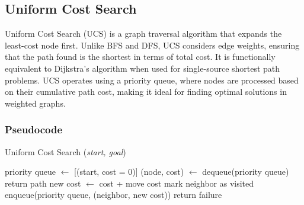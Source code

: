 \subsection{Uniform Cost Search}
\noindent Uniform Cost Search (UCS) is a graph traversal algorithm that expands the least-cost node first. Unlike BFS and DFS, UCS considers edge weights, ensuring that the path found is the shortest in terms of total cost. It is functionally equivalent to Dijkstra’s algorithm when used for single-source shortest path problems. UCS operates using a priority queue, where nodes are processed based on their cumulative path cost, making it ideal for finding optimal solutions in weighted graphs.

\subsubsection{Pseudocode}
\begin{algorithm}[H]
	\caption{Uniform Cost Search (\textit{start, goal})}
	\label{alg:ucs}
	\begin{algorithmic}[1]
		\State priority queue \(\gets\) [(start, cost = 0)]
		\State (node, cost) \(\gets\) dequeue(priority queue)
		\State return path
		\EndIf
		\State new cost \(\gets\) cost + move cost
		\State mark neighbor as visited
		\State enqueue(priority queue, (neighbor, new cost))
		\EndIf
		\EndFor
		\EndWhile
		\State return failure
	\end{algorithmic}
\end{algorithm}

